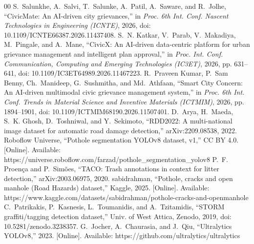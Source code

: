 \documentclass[conference]{IEEEtran}
\begin{document}
\begin{thebibliography}{00}
 S.~Salunkhe, A.~Salvi, T.~Salunke, A.~Patil, A.~Saware, and R.~Jolhe, ``CivicMate: An AI-driven city grievances,'' in \textit{Proc. 6th Int. Conf. Nascent Technologies in Engineering (ICNTE)}, 2026, doi: 10.1109/ICNTE66387.2026.11437408.
 S.~N. Katkar, V.~Parab, V.~Makadiya, M.~Pingale, and A.~Mane, ``CivicX: An AI-driven data-centric platform for urban grievance management and intelligent plan approval,'' in \textit{Proc. Int. Conf. Communication, Computing and Emerging Technologies (IC3ET)}, 2026, pp. 631--641, doi: 10.1109/IC3ET64989.2026.11467223.
 R.~Praveen Kumar, P.~Sam Benny, Ch.~Manideep, G.~Sushmitha, and Md.~Athfaan, ``Smart City Concern: An AI-driven multimodal civic grievance management system,'' in \textit{Proc. 6th Int. Conf. Trends in Material Science and Inventive Materials (ICTMIM)}, 2026, pp. 1894--1901, doi: 10.1109/ICTMIM68190.2026.11507401.
 D.~Arya, H.~Maeda, S.~K. Ghosh, D.~Toshniwal, and Y.~Sekimoto, ``RDD2022: A multi-national image dataset for automatic road damage detection,'' arXiv:2209.08538, 2022.
 Roboflow Universe, ``Pothole segmentation YOLOv8 dataset, v1,'' CC BY 4.0. [Online]. Available: https://universe.roboflow.com/farzad/pothole\_segmentation\_yolov8
 P.~F. Proen\c{c}a and P.~Sim\~{o}es, ``TACO: Trash annotations in context for litter detection,'' arXiv:2003.06975, 2020.
 sabidrahman, ``Pothole, cracks and open manhole (Road Hazards) dataset,'' Kaggle, 2025. [Online]. Available: https://www.kaggle.com/datasets/sabidrahman/pothole-cracks-and-openmanhole
 C.~Patrikakis, P.~Kasnesis, L.~Toumanidis, and A.~Tzitamidis, ``STORM graffiti/tagging detection dataset,'' Univ. of West Attica, Zenodo, 2019, doi: 10.5281/zenodo.3238357.
 G.~Jocher, A.~Chaurasia, and J.~Qiu, ``Ultralytics YOLOv8,'' 2023. [Online]. Available: https://github.com/ultralytics/ultralytics
\end{thebibliography}
\end{document}
